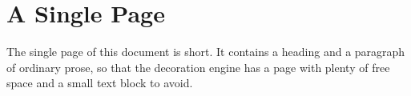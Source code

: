 \documentclass[11pt]{article}
\begin{document}
\section*{A Single Page}
The single page of this document is short. It contains a heading and a
paragraph of ordinary prose, so that the decoration engine has a page with
plenty of free space and a small text block to avoid.
\end{document}
